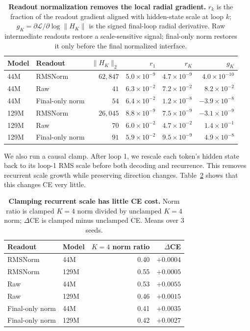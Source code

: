 \begin{table}[t]
\centering
\small
\caption{\textbf{Readout normalization removes the local radial gradient.}
$r_k$ is the fraction of the readout gradient aligned with hidden-state scale at loop $k$; $g_K=\partial\mathcal{L}/\partial\log\|H_K\|$ is the signed final-loop radial derivative.
Raw intermediate readouts restore a scale-sensitive signal; final-only norm restores it only before the final normalized interface.}
\label{tab:radial}
\begin{tabular}{llrrrr}
\toprule
\textbf{Model} & \textbf{Readout} & $\|H_K\|_2$ & $r_1$ & $r_K$ & $g_K$ \\
\midrule
44M & RMSNorm & $62{,}847$ & $5.0{\times}10^{-9}$ & $4.7{\times}10^{-9}$ & $4.0{\times}10^{-10}$ \\
44M & Raw & $41$ & $6.3{\times}10^{-2}$ & $7.2{\times}10^{-2}$ & $8.2{\times}10^{-2}$ \\
44M & Final-only norm & $54$ & $6.4{\times}10^{-2}$ & $1.2{\times}10^{-8}$ & $-3.9{\times}10^{-8}$ \\
129M & RMSNorm & $26{,}045$ & $8.8{\times}10^{-9}$ & $7.5{\times}10^{-9}$ & $-3.1{\times}10^{-9}$ \\
129M & Raw & $70$ & $6.0{\times}10^{-2}$ & $4.7{\times}10^{-2}$ & $1.4{\times}10^{-1}$ \\
129M & Final-only norm & $91$ & $5.9{\times}10^{-2}$ & $9.5{\times}10^{-9}$ & $4.9{\times}10^{-8}$ \\
\bottomrule
\end{tabular}
\end{table}

We also run a causal clamp.
After loop 1, we rescale each token's hidden state back to its loop-1 RMS scale before both decoding and recurrence.
This removes recurrent scale growth while preserving direction changes.
Table~\ref{tab:radial-clamp} shows that this changes CE very little.

\begin{table}[t]
\centering
\small
\caption{\textbf{Clamping recurrent scale has little CE cost.} Norm ratio is clamped $K=4$ norm divided by unclamped $K=4$ norm; $\Delta$CE is clamped minus unclamped CE. Means over 3 seeds.}
\label{tab:radial-clamp}
\begin{tabular}{llrr}
\toprule
\textbf{Readout} & \textbf{Model} & \textbf{$K=4$ norm ratio} & \textbf{$\Delta$CE} \\
\midrule
RMSNorm & 44M & 0.40 & $+0.0004$ \\
RMSNorm & 129M & 0.55 & $+0.0005$ \\
Raw & 44M & 0.53 & $+0.0055$ \\
Raw & 129M & 0.46 & $+0.0015$ \\
Final-only norm & 44M & 0.41 & $+0.0035$ \\
Final-only norm & 129M & 0.42 & $+0.0027$ \\
\bottomrule
\end{tabular}
\end{table}

